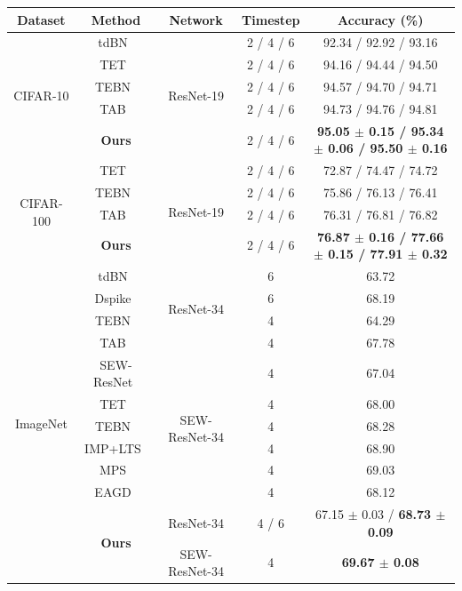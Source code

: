 \begin{table}[t!]
\centering
\small
\begin{tabular}{ccccc}
\toprule
\textbf{Dataset} & \textbf{Method} & \textbf{Network} & \textbf{Timestep} & \textbf{Accuracy (\%)} \\
\toprule
\multirow{5}{*}{CIFAR-10} & tdBN~\cite{zheng:2021} & \multirow{5}{*}{ResNet-19} & 2 / 4 / 6 & 92.34 / 92.92 / 93.16 \\
& TET~\cite{deng:2022} & & 2 / 4 / 6 & 94.16 / 94.44 / 94.50 \\
& TEBN~\cite{tebn:2022} & & 2 / 4 / 6 & 94.57 / 94.70 / 94.71 \\
& TAB~\cite{tab:2024} & & 2 / 4 / 6 & 94.73 / 94.76 / 94.81 \\
& \textbf{Ours} & & 2 / 4 / 6 & \textbf{95.05 $\pm$ 0.15 / 95.34 $\pm$ 0.06 / 95.50 $\pm$ 0.16} \\
\midrule
\multirow{4}{*}{CIFAR-100} & TET~\cite{deng:2022} & \multirow{4}{*}{ResNet-19} & 2 / 4 / 6 & 72.87 / 74.47 / 74.72 \\
& TEBN~\cite{tebn:2022} & & 2 / 4 / 6 & 75.86 / 76.13 / 76.41 \\
& TAB~\cite{tab:2024} & & 2 / 4 / 6 & 76.31 / 76.81 / 76.82 \\
& \textbf{Ours} & & 2 / 4 / 6 & \textbf{76.87 $\pm$ 0.16 / 77.66 $\pm$ 0.15 / 77.91 $\pm$ 0.32} \\
\midrule
\multirow{12}{*}{ImageNet} & tdBN~\cite{zheng:2021} & \multirow{4}{*}{ResNet-34} & 6 & 63.72 \\
& Dspike~\cite{li:2021} & & 6 & 68.19 \\
& TEBN~\cite{tebn:2022} & & 4 & 64.29 \\
& TAB~\cite{tab:2024} & & 4 & 67.78 \\
\cline{2-5}
& SEW-ResNet~\cite{fang:2021_2} & \multirow{6}{*}{SEW-ResNet-34} & 4 & 67.04 \\
& TET~\cite{deng:2022} & & 4 & 68.00 \\
& TEBN~\cite{tebn:2022} & & 4 & 68.28 \\
& IMP+LTS~\cite{shen:2024} & & 4 & 68.90 \\
& MPS~\cite{ding:2025} & & 4 & 69.03 \\
& EAGD~\cite{yang:2025} & & 4 & 68.12 \\
\cline{2-5}
& \multirow{2}{*}{\textbf{Ours}} & ResNet-34 & 4 / 6 & 67.15 $\pm$ 0.03 / \textbf{68.73 $\pm$ 0.09} \\
& & SEW-ResNet-34 & 4 & \textbf{69.67 $\pm$ 0.08} \\
\midrule

\end{tabular}
\end{table}
